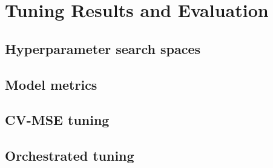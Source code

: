 \chapter{Tuning Results and Evaluation}

\section{Hyperparameter search spaces}

\section{Model metrics}

\section{CV-MSE tuning}

\section{Orchestrated tuning}






